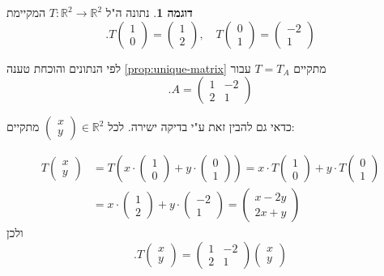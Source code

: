\documentclass[12pt]{report}
\theoremstyle{plain}
\theoremstyle{definition}
\newtheorem{example}{דוגמה}[chapter]
\newcommand{\R}{\mathbb{R}}
\newcommand{\0}{\mathbf{0}}
\begin{document}
\begin{example}
נתונה ה"ל 
$T:\R^2\to\R^2$
המקיימת
$$
.T\begin{pmatrix}1 \\ 0\end{pmatrix}=\begin{pmatrix}1 \\ 2\end{pmatrix},\quad T\begin{pmatrix}0 \\ 1\end{pmatrix}=\begin{pmatrix}-2 \\ 1\end{pmatrix}
$$

לפי הנתונים והוכחת טענה
\ref{prop:unique-matrix}
מתקיים
$T=T_A$
עבור
$$
.A=\begin{pmatrix}
1 & -2 \\
2 & 1
\end{pmatrix}
$$

כדאי גם להבין זאת ע"י בדיקה ישירה. לכל
$\begin{pmatrix}x\\y\end{pmatrix}\in\R^2$
מתקיים:

$$
\begin{aligned}
T\begin{pmatrix}x\\y\end{pmatrix}&=T\left(x\cdot\begin{pmatrix}1\\0\end{pmatrix}+y\cdot\begin{pmatrix}0\\1\end{pmatrix}\right)=x\cdot T\begin{pmatrix}1\\0\end{pmatrix}+y\cdot T\begin{pmatrix}0\\1\end{pmatrix}\\
&=x\cdot\begin{pmatrix}1 \\ 2\end{pmatrix}+y\cdot\begin{pmatrix}-2 \\ 1\end{pmatrix}=\begin{pmatrix}x-2y \\ 2x+y \end{pmatrix}
\end{aligned}
$$
ולכן
$$
.T\begin{pmatrix}x\\y\end{pmatrix}=\begin{pmatrix}
1 & -2 \\
2 & 1
\end{pmatrix}\begin{pmatrix}x\\y\end{pmatrix}
$$

\end{example}
\end{document}
